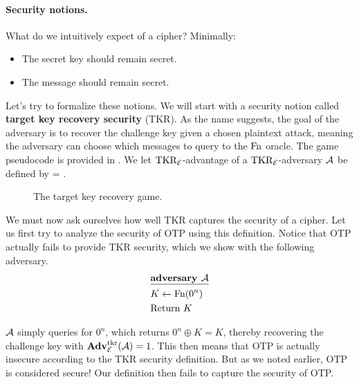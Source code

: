 \paragraph{Security notions.} What do we intuitively expect of a cipher?
Minimally:
\begin{itemize}
\item The secret key should remain secret.
\item The message should remain secret.
\end{itemize}

Let's try to formalize these notions. We will start with a security notion called \textbf{target key recovery security} (TKR).
As the name suggests, the goal of the adversary is to recover the challenge key given a chosen plaintext attack, meaning the adversary can choose which messages to query to the $\textnormal{Fn}$ oracle. The game pseudocode is provided in . We let $\textnormal{TKR}_{\cal E}$-advantage of a $\textnormal{TKR}_{\cal E}$-adversary ${\mathcal A}$ be defined by 
\bnm
\AdvTKR{\cipher}{\advA} = \Prob{\TKR^\advA_\cipherE \Rightarrow\true}  \;.
\enm

\begin{figure}[p]
	\centering
	\caption{The target key recovery game.}
	\label{fig:tkr}
\end{figure}


We must now ask ourselves how well TKR captures the security of a cipher. Let us first try to analyze the security of OTP using this definition. Notice that OTP actually fails to provide TKR security, which we show with the following adversary.
\begin{align*}
&\underline{\textbf{adversary } {\mathcal A}} \\
&K \gets \textnormal{Fn}(0^n) \\
&\text{Return } K 
\end{align*}	

${\mathcal A}$ simply queries for $0^n$, which returns $0^n \oplus K = K$, thereby recovering the challenge key with $\mathbf{Adv}^{\mathrm{tkr}}_{{\cal E}}({\mathcal A}) = 1$. This then means that OTP is actually insecure according to the TKR security definition. But as we noted earlier, OTP is considered secure! Our definition then fails to capture the security of OTP. 


